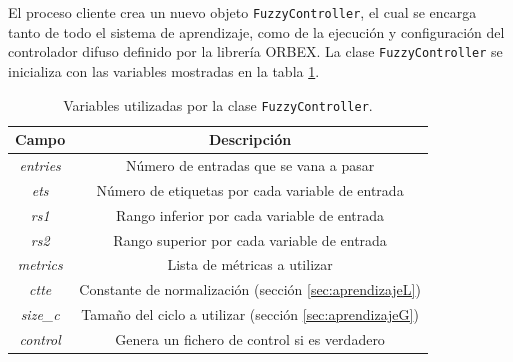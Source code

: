 
El proceso cliente crea un nuevo objeto {\tt FuzzyController}, el cual se encarga tanto de todo el sistema de aprendizaje, como de la ejecución y configuración del controlador difuso definido por la librería \gls{ORBEX}. La clase {\tt FuzzyController} se inicializa con las variables mostradas en la tabla \ref{tab:fuzzycontroller}. 


\begin{table}[htb]
	\centering
		\begin{tabular}{|c|c|}
			\hline
			\rowcolor[gray]{0.9} \textbf{Campo} & \textbf{Descripción} \\ \hline \hline
			\textit{entries} & Número de entradas que se vana a pasar \\ \hline
			\textit{ets} & Número de etiquetas por cada variable de entrada \\ \hline
			\textit{rs1} & Rango inferior por cada variable de entrada \\ \hline
			\textit{rs2} & Rango superior por cada variable de entrada \\ \hline
			\textit{metrics} & Lista de métricas a utilizar \\ \hline
			\textit{ctte} & Constante de normalización (sección \ref{sec:aprendizajeL})\\ \hline
			\textit{size\_c} & Tamaño del ciclo a utilizar (sección \ref{sec:aprendizajeG}) \\ \hline
			\textit{control} & Genera un fichero de control si es verdadero \\ \hline
		\end{tabular}
		\caption{Variables utilizadas por la clase {\tt FuzzyController}.}
		\label{tab:fuzzycontroller}
\end{table}


